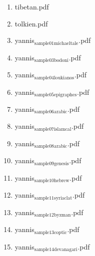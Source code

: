 \documentclass[11pt]{article}
\begin{document}
\begin{enumerate}
\begin{enumerate}
\item tibetan.pdf
\label{sec-1-1-1-1-46-9-20-14}

\item tolkien.pdf
\label{sec-1-1-1-1-46-9-20-15}

\item yannis$_{\text{sample01michaeltale}}$.pdf
\label{sec-1-1-1-1-46-9-20-16}

\item yannis$_{\text{sample03bodoni}}$.pdf
\label{sec-1-1-1-1-46-9-20-17}

\item yannis$_{\text{sample04loukianos}}$.pdf
\label{sec-1-1-1-1-46-9-20-18}

\item yannis$_{\text{sample05epigraphes}}$.pdf
\label{sec-1-1-1-1-46-9-20-19}

\item yannis$_{\text{sample06arabic}}$.pdf
\label{sec-1-1-1-1-46-9-20-20}

\item yannis$_{\text{sample07islamcal}}$.pdf
\label{sec-1-1-1-1-46-9-20-21}

\item yannis$_{\text{sample08arabic}}$.pdf
\label{sec-1-1-1-1-46-9-20-22}

\item yannis$_{\text{sample09genesis}}$.pdf
\label{sec-1-1-1-1-46-9-20-23}

\item yannis$_{\text{sample10hebrew}}$.pdf
\label{sec-1-1-1-1-46-9-20-24}

\item yannis$_{\text{sample11syriaclat}}$.pdf
\label{sec-1-1-1-1-46-9-20-25}

\item yannis$_{\text{sample12byzman}}$.pdf
\label{sec-1-1-1-1-46-9-20-26}

\item yannis$_{\text{sample13coptic}}$.pdf
\label{sec-1-1-1-1-46-9-20-27}

\item yannis$_{\text{sample14devanagari}}$.pdf
\label{sec-1-1-1-1-46-9-20-28}
\end{enumerate}
\end{enumerate}
\end{document}
